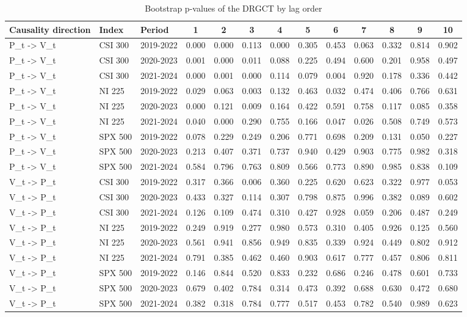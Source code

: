 \begin{table}[htbp]
\centering
\caption{Bootstrap p-values of the DRGCT by lag order}
\label{tab:pvalues}
\small
\begin{tabular}{lllcccccccccc}
\toprule
Causality direction & Index & Period & 1 & 2 & 3 & 4 & 5 & 6 & 7 & 8 & 9 & 10 \\
\midrule
P\_t -> V\_t & CSI 300 & 2019-2022 & 0.000 & 0.000 & 0.113 & 0.000 & 0.305 & 0.453 & 0.063 & 0.332 & 0.814 & 0.902 \\
P\_t -> V\_t & CSI 300 & 2020-2023 & 0.001 & 0.000 & 0.011 & 0.088 & 0.225 & 0.494 & 0.600 & 0.201 & 0.958 & 0.497 \\
P\_t -> V\_t & CSI 300 & 2021-2024 & 0.000 & 0.001 & 0.000 & 0.114 & 0.079 & 0.004 & 0.920 & 0.178 & 0.336 & 0.442 \\
P\_t -> V\_t & NI 225 & 2019-2022 & 0.029 & 0.063 & 0.003 & 0.132 & 0.463 & 0.032 & 0.474 & 0.406 & 0.766 & 0.631 \\
P\_t -> V\_t & NI 225 & 2020-2023 & 0.000 & 0.121 & 0.009 & 0.164 & 0.422 & 0.591 & 0.758 & 0.117 & 0.085 & 0.358 \\
P\_t -> V\_t & NI 225 & 2021-2024 & 0.040 & 0.000 & 0.290 & 0.755 & 0.166 & 0.047 & 0.026 & 0.508 & 0.749 & 0.573 \\
P\_t -> V\_t & SPX 500 & 2019-2022 & 0.078 & 0.229 & 0.249 & 0.206 & 0.771 & 0.698 & 0.209 & 0.131 & 0.050 & 0.227 \\
P\_t -> V\_t & SPX 500 & 2020-2023 & 0.213 & 0.407 & 0.371 & 0.737 & 0.940 & 0.429 & 0.903 & 0.775 & 0.982 & 0.318 \\
P\_t -> V\_t & SPX 500 & 2021-2024 & 0.584 & 0.796 & 0.763 & 0.809 & 0.566 & 0.773 & 0.890 & 0.985 & 0.838 & 0.109 \\
V\_t -> P\_t & CSI 300 & 2019-2022 & 0.317 & 0.366 & 0.006 & 0.360 & 0.225 & 0.620 & 0.623 & 0.322 & 0.977 & 0.053 \\
V\_t -> P\_t & CSI 300 & 2020-2023 & 0.433 & 0.327 & 0.114 & 0.307 & 0.798 & 0.875 & 0.996 & 0.382 & 0.089 & 0.602 \\
V\_t -> P\_t & CSI 300 & 2021-2024 & 0.126 & 0.109 & 0.474 & 0.310 & 0.427 & 0.928 & 0.059 & 0.206 & 0.487 & 0.249 \\
V\_t -> P\_t & NI 225 & 2019-2022 & 0.249 & 0.919 & 0.277 & 0.980 & 0.573 & 0.310 & 0.405 & 0.926 & 0.125 & 0.560 \\
V\_t -> P\_t & NI 225 & 2020-2023 & 0.561 & 0.941 & 0.856 & 0.949 & 0.835 & 0.339 & 0.924 & 0.449 & 0.802 & 0.912 \\
V\_t -> P\_t & NI 225 & 2021-2024 & 0.791 & 0.385 & 0.462 & 0.460 & 0.903 & 0.617 & 0.777 & 0.457 & 0.806 & 0.811 \\
V\_t -> P\_t & SPX 500 & 2019-2022 & 0.146 & 0.844 & 0.520 & 0.833 & 0.232 & 0.686 & 0.246 & 0.478 & 0.601 & 0.733 \\
V\_t -> P\_t & SPX 500 & 2020-2023 & 0.679 & 0.402 & 0.784 & 0.314 & 0.473 & 0.392 & 0.688 & 0.630 & 0.472 & 0.680 \\
V\_t -> P\_t & SPX 500 & 2021-2024 & 0.382 & 0.318 & 0.784 & 0.777 & 0.517 & 0.453 & 0.782 & 0.540 & 0.989 & 0.623 \\
\bottomrule
\end{tabular}
\end{table}
